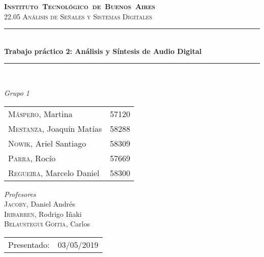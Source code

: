 \begin{titlepage}
\newcommand{\HRule}{\rule{\linewidth}{0.5mm}}
\center
\mbox{\textsc{\LARGE \bfseries {Instituto Tecnol\'ogico de Buenos Aires}}}\\[1.5cm]
\textsc{\Large 22.05 An\'alisis de Se\~nales y Sistemas Digitales}\\[0.5cm]


\HRule \\[0.6cm]
{ \Huge \bfseries Trabajo pr\'actico 2: An\'alisis y S\'intesis de Audio Digital}\\[0.4cm] %
\HRule \\[1.5cm]


{\large

\emph{Grupo 1}\\
\vspace{3px}

\begin{tabular}{lr} 	
\textsc{M\'aspero}, Martina  & 57120 \\
\textsc{Mestanza}, Joaqu\'in Mat\'ias  & 58288 \\
\textsc{Nowik}, Ariel Santiago  & 58309 \\
\textsc{Parra}, Roc\'io  & 57669 \\
\textsc{Regueira}, Marcelo Daniel  & 58300 \\
\end{tabular}

\vspace{20px}

\emph{Profesores}\\
\vspace{3px}
\textsc{Jacoby}, Daniel Andr\'es\\ 	
\textsc{Iribarren}, Rodrigo I\~naki\\ 	
\textsc{Belaustegui Goitia}, Carlos\\ 	

\vspace{100px}

\begin{tabular}{ll}

Presentado: & 03/05/2019\\

\end{tabular}

}

\vfill

\end{titlepage}